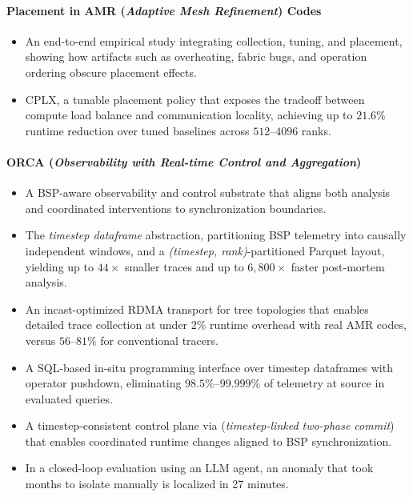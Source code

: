 \paragraph{Placement in AMR (\emph{Adaptive Mesh Refinement}) Codes}
\begin{itemize}
  \item An end-to-end empirical study integrating collection, tuning, and placement, showing how
        artifacts such as overheating, fabric bugs, and operation ordering obscure placement effects.

  \item CPLX, a tunable placement policy that exposes the tradeoff between compute load balance and
        communication locality, achieving up to $21.6\%$ runtime reduction over tuned baselines across
        $512$--$4096$ ranks.
\end{itemize}

\paragraph{ORCA (\emph{Observability with Real-time Control and Aggregation})}
\begin{itemize}
  \item A BSP-aware observability and control substrate that aligns both analysis and coordinated
        interventions to synchronization boundaries.

  \item The \emph{timestep dataframe} abstraction, partitioning BSP telemetry into causally
        independent windows,
        and a \emph{(timestep, rank)}-partitioned
        Parquet layout, yielding up to $44\times$
        smaller traces and up to $6{,}800\times$ faster post-mortem analysis.

  \item An incast-optimized RDMA transport for tree topologies that enables detailed trace collection
        at under $2\%$ runtime overhead with real AMR codes, versus $56$--$81\%$ for conventional tracers.

  \item A SQL-based in-situ programming interface over timestep dataframes with operator pushdown,
        eliminating $98.5\%$--$99.999\%$ of telemetry
        at source in evaluated queries.

  \item A timestep-consistent control plane via \twopc{} (\emph{timestep-linked two-phase commit}) that
        enables coordinated runtime changes aligned to BSP synchronization.

  \item In a closed-loop evaluation using an LLM agent, an anomaly that took months to isolate
        manually is localized in 27 minutes.
\end{itemize}


